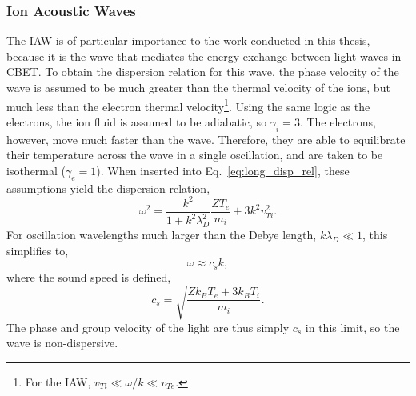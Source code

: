 \subsubsection{Ion Acoustic Waves}%
\label{sec:theory_IAWs}

The \ac{IAW} is of particular importance to the work conducted in this thesis, because it is the wave that mediates the energy exchange between light waves in \ac{CBET}.
To obtain the dispersion relation for this wave, the phase velocity of the wave is assumed to be much greater than the thermal velocity of the ions, but much less than the electron thermal velocity\footnote{For the \ac{IAW}, $v_{Ti}\ll \omega/k \ll v_{Te}$.}.
Using the same logic as the electrons, the ion fluid is assumed to be adiabatic, so $\gamma_i=3$.
The electrons, however, move much faster than the wave.
Therefore, they are able to equilibrate their temperature across the wave in a single oscillation, and are taken to be isothermal ($\gamma_e=1$).
When inserted into Eq.~\ref{eq:long_disp_rel}, these assumptions yield the dispersion relation,
\begin{equation}
    \omega^2 = \frac{k^2}{1 + k^2\lambda_D^2}\frac{ZT_e}{m_i} + 3 k^2 v_{Ti}^2.
\end{equation}
For oscillation wavelengths much larger than the Debye length, $k \lambda_D \ll 1$, this simplifies to,
\begin{equation}
    \omega \approx c_s k,
\end{equation}
where the sound speed is defined,
\begin{equation}
    c_s = \sqrt{\frac{Z k_B T_e + 3 k_B T_i}{m_i}}.
\end{equation}
The phase and group velocity of the light are thus simply $c_s$ in this limit, so the wave is non-dispersive.

